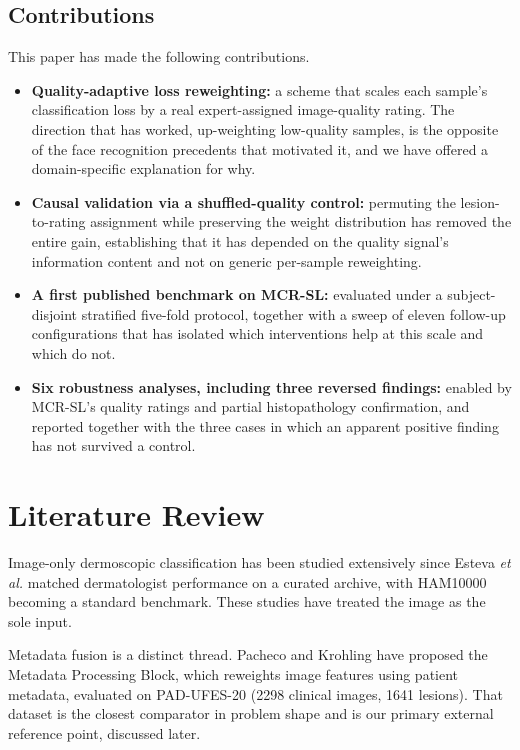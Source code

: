 \documentclass[conference]{IEEEtran}
\begin{document}
\subsection{Contributions}
This paper has made the following contributions.
\begin{itemize}
\item \textbf{Quality-adaptive loss reweighting:} a scheme that scales each sample's classification loss by a real expert-assigned image-quality rating. The direction that has worked, up-weighting low-quality samples, is the opposite of the face recognition precedents that motivated it, and we have offered a domain-specific explanation for why.
\item \textbf{Causal validation via a shuffled-quality control:} permuting the lesion-to-rating assignment while preserving the weight distribution has removed the entire gain, establishing that it has depended on the quality signal's information content and not on generic per-sample reweighting.
\item \textbf{A first published benchmark on MCR-SL:} evaluated under a subject-disjoint stratified five-fold protocol, together with a sweep of eleven follow-up configurations that has isolated which interventions help at this scale and which do not.
\item \textbf{Six robustness analyses, including three reversed findings:} enabled by MCR-SL's quality ratings and partial histopathology confirmation, and reported together with the three cases in which an apparent positive finding has not survived a control.
\end{itemize}

\section{Literature Review}
\label{sec:lit}
Image-only dermoscopic classification has been studied extensively since Esteva \emph{et al.} \cite{esteva2017} matched dermatologist performance on a curated archive, with HAM10000 \cite{ham10000} becoming a standard benchmark. These studies have treated the image as the sole input.

Metadata fusion is a distinct thread. Pacheco and Krohling \cite{metablock} have proposed the Metadata Processing Block, which reweights image features using patient metadata, evaluated on PAD-UFES-20 \cite{paduf20} (2298 clinical images, 1641 lesions). That dataset is the closest comparator in problem shape and is our primary external reference point, discussed later.
\end{document}
